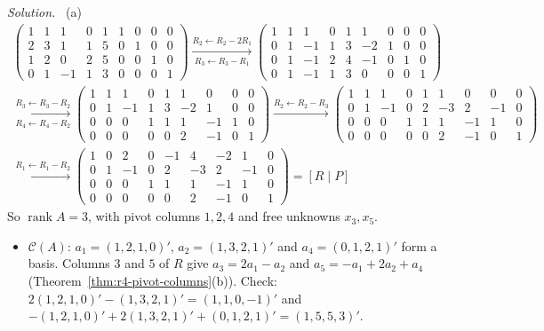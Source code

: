 \documentclass[12pt]{article}
\DeclareMathOperator{\rank}{rank}
\theoremstyle{definition}
\newenvironment{solution}{\par\noindent\textit{Solution.}\ }{\par\smallskip}
\begin{document}
\begin{solution}
(a)
\[
\begin{gathered}
\left(\begin{array}{ccccc|cccc}1&1&1&0&1&1&0&0&0\\2&3&1&1&5&0&1&0&0\\1&2&0&2&5&0&0&1&0\\0&1&-1&1&3&0&0&0&1\end{array}\right)
\xrightarrow[R_3\leftarrow R_3-R_1]{R_2\leftarrow R_2-2R_1}
\left(\begin{array}{ccccc|cccc}1&1&1&0&1&1&0&0&0\\0&1&-1&1&3&-2&1&0&0\\0&1&-1&2&4&-1&0&1&0\\0&1&-1&1&3&0&0&0&1\end{array}\right)
\\
\xrightarrow[R_4\leftarrow R_4-R_2]{R_3\leftarrow R_3-R_2}
\left(\begin{array}{ccccc|cccc}1&1&1&0&1&1&0&0&0\\0&1&-1&1&3&-2&1&0&0\\0&0&0&1&1&1&-1&1&0\\0&0&0&0&0&2&-1&0&1\end{array}\right)
\xrightarrow{R_2\leftarrow R_2-R_3}
\left(\begin{array}{ccccc|cccc}1&1&1&0&1&1&0&0&0\\0&1&-1&0&2&-3&2&-1&0\\0&0&0&1&1&1&-1&1&0\\0&0&0&0&0&2&-1&0&1\end{array}\right)
\\
\xrightarrow{R_1\leftarrow R_1-R_2}
\left(\begin{array}{ccccc|cccc}1&0&2&0&-1&4&-2&1&0\\0&1&-1&0&2&-3&2&-1&0\\0&0&0&1&1&1&-1&1&0\\0&0&0&0&0&2&-1&0&1\end{array}\right)=[R\mid P]
\end{gathered}
\]
So \(\rank A=3\), with pivot columns \(1,2,4\) and free unknowns \(x_3,x_5\).
\begin{itemize}
\item \(\mathcal C(A)\): \(a_1=(1,2,1,0)'\), \(a_2=(1,3,2,1)'\) and \(a_4=(0,1,2,1)'\) form a basis. Columns \(3\) and
\(5\) of \(R\) give \(a_3=2a_1-a_2\) and \(a_5=-a_1+2a_2+a_4\) (Theorem~\ref{thm:r4-pivot-columns}(b)). Check:
\(2(1,2,1,0)'-(1,3,2,1)'=(1,1,0,-1)'\) and \(-(1,2,1,0)'+2(1,3,2,1)'+(0,1,2,1)'=(1,5,5,3)'\).

\end{itemize}
\end{solution}
\end{document}
